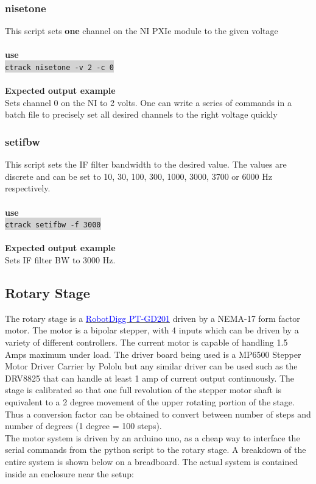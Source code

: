 \documentclass[hidelinks]{article}
\newcommand{\code}[1]{\colorbox{lightgray}{\texttt{#1}}}
\begin{document}
\subsubsection{nisetone}
This script sets \textbf{one} channel on the NI PXIe module to the given voltage
\\\\\textbf{use}\\
\code{ctrack nisetone -v 2 -c 0}\\\\
\textbf{Expected output example}\\
Sets channel 0 on the NI to 2 volts. One can write a series of commands in a batch file to precisely set all desired channels to the right voltage quickly
\subsubsection{setifbw}
This script sets the IF filter bandwidth to the desired value. The values are discrete and can be set to 10, 30, 100, 300, 1000, 3000, 3700 or 6000 Hz respectively.
\\\\\textbf{use}\\
\code{ctrack setifbw -f 3000}\\\\
\textbf{Expected output example}\\
Sets IF filter BW to 3000 Hz.
\clearpage
\subsection{Rotary Stage}
The rotary stage is a \href{https://www.robotdigg.com/product/1628/PT-GD201-203-and-204-Stepper-Motorized-Electric-Rotary-Table}{\textcolor{blue}{RobotDigg PT-GD201}} driven by a NEMA-17 form factor motor. The motor is a bipolar stepper, with 4 inputs which can be driven by a variety of different controllers. The current motor is capable of handling 1.5 Amps maximum under load. The driver board being used is a MP6500 Stepper Motor Driver Carrier by Pololu but any similar driver can be used such as the DRV8825 that can handle at least 1 amp of current output continuously. The stage is calibrated so that one full revolution of the stepper motor shaft is equivalent to a 2 degree movement of the upper rotating portion of the stage. Thus a conversion factor can be obtained to convert between number of steps and number of degrees (1 degree = 100 steps).\\

The motor system is driven by an arduino uno, as a cheap way to interface the serial commands from the python script to the rotary stage. A breakdown of the entire system is shown below on a breadboard. The actual system is contained inside an enclosure near the setup:
\end{document}
